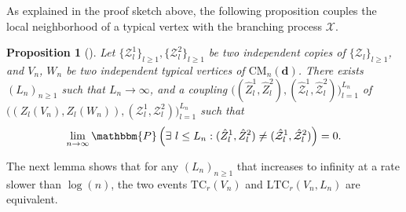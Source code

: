 \documentclass[11pt,a4paper, reqno]{article}
\numberwithin{equation}{section}
\numberwithin{equation}{section}
\newcommand{\prob}[1]{\ensuremath{\mathbbm{P}\left(#1\right)}}
\newcommand{\1}{\ensuremath{\mathbbm{1}}}
\newcommand{\CM}{\ensuremath{\mathrm{CM}_n(\boldsymbol{d})}}
\newcommand{\TC}{\mathrm{TC}}
\newcommand{\LTC}{\mathrm{LTC}}
\newtheorem{proposition}[theorem]{Proposition}
\numberwithin{equation}{section}
\numberwithin{theorem}{section}
\begin{document}
As explained in the proof sketch above, the following proposition couples the local neighborhood of a typical vertex with the branching process $\mathcal{X}$.
\begin{proposition}[{\cite[Proposition~5.4]{RGCN2}}]
\label{prop-coupling} 
Let $\{\mathcal{Z}^1_l\}_{l\geq 1}, \{\mathcal{Z}^2_l\}_{l\geq 1}$ be two independent copies  of $\{\mathcal{Z}_l\}_{l\geq 1}$, and
 $V_n$, $W_n$ be two independent typical vertices of $\CM$. 
 There exists $(L_n)_{n\geq 1}$ such that $L_n\to \infty$, and a coupling $\big((\hat{Z}^1_l, \hat{Z}^2_l), (\hat{\mathcal{Z}}^1_l,\hat{\mathcal{Z}}^2_l)\big)_{l=1}^{L_n}$ of $\big((Z_l(V_n), Z_l(W_n)), (\mathcal{Z}^1_l,\mathcal{Z}^2_l)\big)_{l=1}^{L_n}$ such that 
 \begin{equation}\label{eq:coupling}
 \lim_{n\to\infty}\prob{\exists\ l\leq L_n: (\hat{Z}^1_l, \hat{Z}^2_l)\neq (\hat{\mathcal{Z}}^1_l,\hat{\mathcal{Z}}^2_l)}=0.
 \end{equation}
\end{proposition}
The next lemma shows that for any $(L_n)_{n\geq 1}$ that increases to infinity at a rate slower than $\log(n)$, the two events $\TC_r(V_n)$ and $\LTC_r(V_n, L_n)$ are equivalent.
\end{document}

